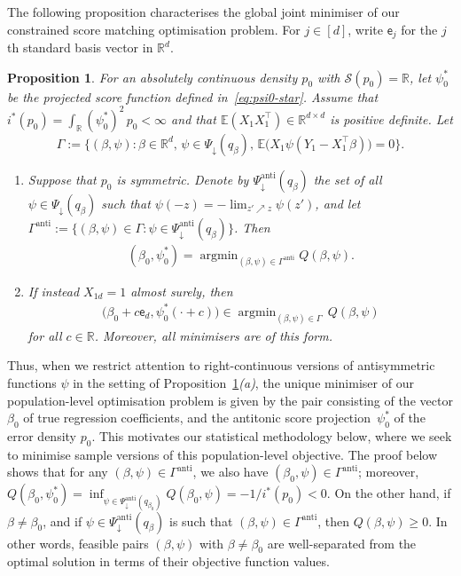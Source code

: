 \documentclass[a4paper]{article}
\newcommand{\R}{\mathbb{R}}
\newcommand{\E}{\mathbb{E}}
\DeclareMathOperator*{\argmin}{argmin}
\newtheorem{proposition}[theorem]{Proposition}
\theoremstyle{definition}
\begin{document}
The following proposition characterises the global joint minimiser of our constrained score matching optimisation problem. For $j \in [d]$, write $\mathsf{e}_j$ for the $j$th standard basis vector in $\R^d$.
\begin{proposition}
\label{prop:joint-min}
For an absolutely continuous density $p_0$ with $\mathcal{S}(p_0) = \R$, let $\psi^*_0$ be the projected score function defined in~\eqref{eq:psi0-star}.  Assume that $i^*(p_0) = \int_\R (\psi_0^*)^2\,p_0 < \infty$ and that $\E(X_1 X_1^\top) \in \R^{d \times d}$ is positive definite. Let
\[
\Gamma := \bigl\{(\beta,\psi) : \beta \in \R^d,\,\psi \in \Psi_\downarrow(q_\beta),\,\E\bigl(X_1\psi(Y_1 - X_1^\top \beta)\bigr) = 0\bigr\}.
\]
\begin{enumerate}[label=(\alph*)]
\item Suppose that $p_0$ is symmetric. Denote by $\Psi_\downarrow^{\mathrm{anti}}(q_\beta)$ the set of all $\psi \in \Psi_\downarrow(q_\beta)$ such that $\psi(-z) = -\lim_{z' \nearrow z}\psi(z')$, and let $\Gamma^{\mathrm{anti}} := \{(\beta,\psi) \in \Gamma : \psi \in \Psi_\downarrow^{\mathrm{anti}}(q_\beta)\}$. Then
\begin{align*}
(\beta_0,\psi_0^*) = \argmin_{(\beta,\psi) \in \Gamma^{\mathrm{anti}}} Q(\beta,\psi).
\end{align*}
\item If instead $X_{1d} = 1$ almost surely, then 
\begin{align*}
\bigl(\beta_0 + c \mathsf{e}_d, \psi_0^*(\cdot + c)\bigr) \in \argmin_{(\beta,\psi) \in \Gamma}\,Q(\beta,\psi)
\end{align*}
for all $c \in \R$. Moreover, all minimisers are of this form.
\end{enumerate}
\end{proposition}
Thus, when we restrict attention to right-continuous versions of antisymmetric functions $\psi$ in the setting of Proposition~\ref{prop:joint-min}\emph{(a)}, the unique minimiser of our population-level optimisation problem is given by the pair consisting of the vector $\beta_0$ of true regression coefficients, and the antitonic score projection~$\psi_0^*$ of the error density $p_0$.  This motivates our statistical methodology below, where we seek to minimise sample versions of this population-level objective. The proof below shows that for any $(\beta,\psi) \in \Gamma^{\mathrm{anti}}$, we also have $(\beta_0,\psi) \in \Gamma^{\mathrm{anti}}$; moreover, $Q(\beta_0,\psi_0^*) = \inf_{\psi \in \Psi_{\downarrow}^{\mathrm{anti}}(q_{\beta_0})} Q(\beta_0, \psi) = -1/i^*(p_0) < 0$.  On the other hand, if $\beta \neq \beta_0$, and if $\psi \in \Psi_{\downarrow}^{\mathrm{anti}}(q_\beta)$ is such that $(\beta,\psi) \in \Gamma^{\mathrm{anti}}$, then $Q(\beta,\psi) \geq 0$.  In other words, feasible pairs $(\beta,\psi)$ with $\beta \neq \beta_0$ are well-separated from the optimal solution in terms of their objective function values.
\end{document}
